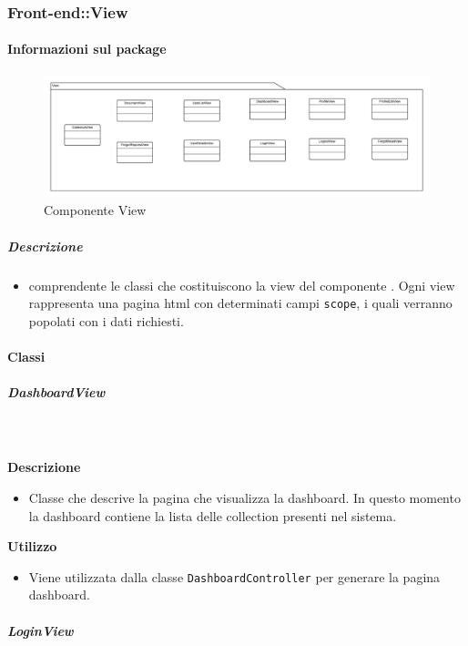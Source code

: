 	\subsubsection{Front-end::View}
	\paragraph{Informazioni sul package} 
		\begin{figure}[H] 
			\begin{center} 
				\includegraphics[width=\textwidth]{uml/package/Front-end::View.png}  
				\caption{Componente View}
			\end{center}  
		\end{figure} 
	\subparagraph{Descrizione} 
		\begin{itemize}
		\item[]  comprendente le classi che costituiscono la view del componente . Ogni view rappresenta una pagina html con determinati campi \texttt{scope}, i quali verranno popolati con i dati richiesti.
		\end{itemize} 
		\paragraph{Classi}
			\subparagraph{DashboardView}
				
				\textbf{\\ \\ Descrizione} 
					\begin{itemize}
						\item[] Classe che descrive la pagina che visualizza la dashboard. In questo momento la dashboard contiene la lista delle collection presenti nel sistema.
					\end{itemize}      
				\textbf{Utilizzo}  
					\begin{itemize}
						\item[] Viene utilizzata dalla classe \texttt{DashboardController} per generare la pagina dashboard.
					\end{itemize}
			\subparagraph{LoginView}
				
